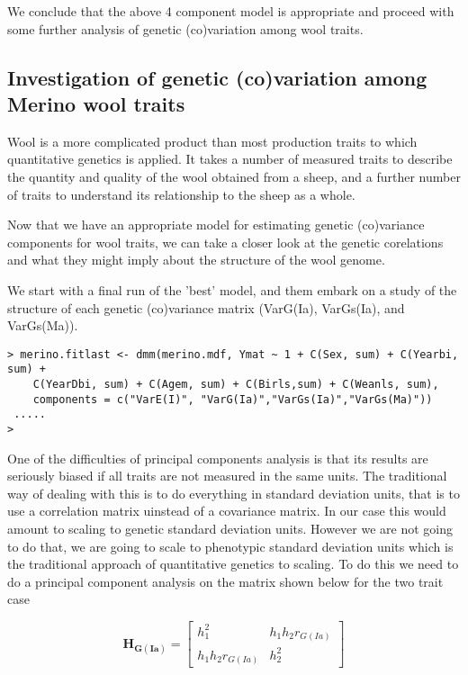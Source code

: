 \documentclass[titlepage]{article}  %
\begin{document}
We conclude that the above 4 component model is appropriate and proceed with some further analysis of genetic (co)variation among wool traits.

\subsection{Investigation of genetic (co)variation among Merino wool traits}

Wool is a more complicated product than most production traits to which quantitative genetics is applied. It takes a number of measured traits to describe the quantity and quality of the wool obtained from a sheep, and a further number of traits to understand its relationship to the sheep as a whole.

Now that we have an appropriate model for estimating genetic (co)variance components for wool traits, we can take a closer look at the genetic corelations and what they might imply about the structure of the wool genome.

We start with a final run of the 'best' model, and them embark on a study of the structure of each genetic (co)variance matrix (VarG(Ia), VarGs(Ia), and VarGs(Ma)).

\begin{verbatim}
> merino.fitlast <- dmm(merino.mdf, Ymat ~ 1 + C(Sex, sum) + C(Yearbi, sum) +
    C(YearDbi, sum) + C(Agem, sum) + C(Birls,sum) + C(Weanls, sum),
    components = c("VarE(I)", "VarG(Ia)","VarGs(Ia)","VarGs(Ma)"))
 .....
>
\end{verbatim}

One of the difficulties of principal components analysis is that its results are seriously biased if all traits are not measured in the same units. The traditional way of dealing with this is to do everything in standard deviation units, that is to use a correlation matrix uinstead of a covariance matrix. In our case this would amount to scaling to genetic standard deviation units. However we are not going to do that, we are going to scale to phenotypic standard deviation units which is the traditional approach of quantitative genetics to scaling. To do this we need to do a principal component analysis on the matrix shown below for the two trait case

\begin{displaymath}
\bm{H_{G(Ia)}} = 
 \left[ \begin{array}{cc}
 h^{2}_{1} & h_{1}h_{2}r_{G(Ia)} \\
 h_{1}h_{2}r_{G(Ia)} & h^{2}_{2}
\end{array} \right]
\end{displaymath}
\end{document}
